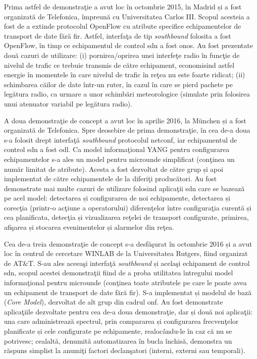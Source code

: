 Prima astfel de demonstraţie a avut loc în octombrie 2015, în Madrid și a fost organizată de Telefonica, împreună cu Universitatea Carlos III. Scopul acesteia a fost de a extinde protocolul OpenFlow cu atribute specifice echipamentelor de transport de date fără fir. Astfel, interfaţa de tip \textit{southbound} folosita a fost OpenFlow, în timp ce echipamentul de control \gls{sdn} a fost \gls{onos}. Au fost prezentate două cazuri de utilizare: (i) pornirea/oprirea unei interfeţe radio în funcţie de nivelul de trafic ce trebuie transmis de către echipament, economisind astfel energie în momentele în care nivelul de trafic în reţea nu este foarte ridicat; (ii) schimbarea căilor de date într-un ruter, în cazul în care se pierd pachete pe legătura radio, ca urmare a unor schimbări meteorologice (simulate prin folosirea unui atenuator variabil pe legătura radio).

A doua demonstraţie de concept a avut loc în aprilie 2016, la München și a fost organizată de Telefonica. Spre deosebire de prima demonstraţie, în cea de-a doua s-a folosit drept interfaţă \textit{southbound} protocolul \gls{netconf}, iar echipamentul de control \gls{sdn} a fost \gls{odl}. Ca model informaţional YANG pentru configurarea echipamentelor s-a ales un model pentru microunde simplificat (conţinea un număr limitat de atribute). Acesta a fost dezvoltat de către grup și apoi implementat de către echipamentele de la diferiţi producători. Au fost demonstrate mai multe cazuri de utilizare folosind aplicaţii \gls{sdn} care se bazează pe acel model: detectarea și configurarea de noi echipamente, detectarea și corecţia (printr-o acţiune a operatorului) diferenţelor între configuraţia curentă și cea planificata, detecţia și vizualizarea reţelei de transport configurate, primirea, afişarea și stocarea evenimentelor și alarmelor din reţea.

Cea de-a treia demonstraţie de concept s-a desfăşurat în octombrie 2016 și a avut loc în centrul de cercetare WINLAB de la Universitatea Rutgers, fiind organizat de AT\&T. S-au ales aceeaşi interfaţă \textit{southbound} și acelaşi echipament de control \gls{sdn}, scopul acestei demonstraţii fiind de a proba utilitatea întregului model informaţional pentru microunde (conţinea toate atributele pe care le poate avea un echipament de transport de date fără fir). S-a implementat și modelul de bază (\textit{Core Model}), dezvoltat de alt grup din cadrul \gls{onf}. Au fost demonstrate aplicaţiile dezvoltate pentru cea de-a doua demonstraţie, dar și două noi aplicaţii: una care administrează spectrul, prin compararea și configurarea frecvenţelor planificate și cele configurate pe echipamente, realocându-le în caz că nu se potrivesc; cealaltă, denumită automatizarea în bucla închisă, demonstra un răspuns simplist la anumiţi factori declanşatori (interni, externi sau temporali).

